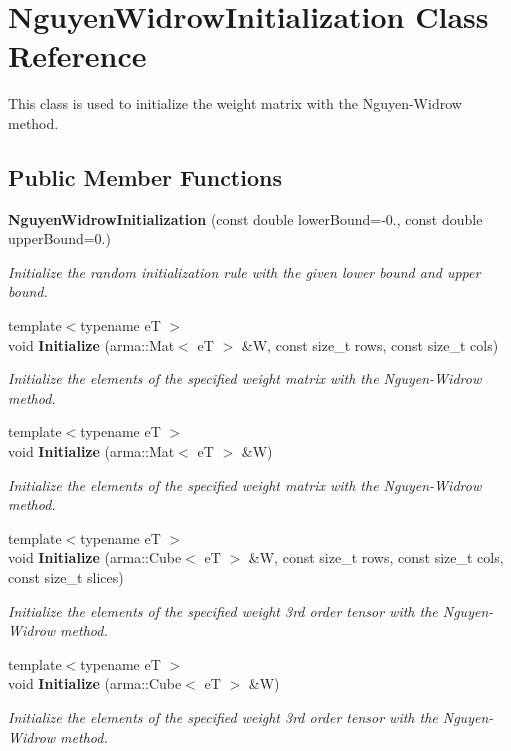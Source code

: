 \section{Nguyen\+Widrow\+Initialization Class Reference}
\label{classmlpack_1_1ann_1_1NguyenWidrowInitialization}


This class is used to initialize the weight matrix with the Nguyen-\/\+Widrow method.  


\subsection*{Public Member Functions}
\begin{DoxyCompactItemize}
\item 
\textbf{ Nguyen\+Widrow\+Initialization} (const double lower\+Bound=-\/0., const double upper\+Bound=0.)
\begin{DoxyCompactList}\small\item\em Initialize the random initialization rule with the given lower bound and upper bound. \end{DoxyCompactList}\item 
{\footnotesize template$<$typename eT $>$ }\\void \textbf{ Initialize} (arma\+::\+Mat$<$ eT $>$ \&W, const size\+\_\+t rows, const size\+\_\+t cols)
\begin{DoxyCompactList}\small\item\em Initialize the elements of the specified weight matrix with the Nguyen-\/\+Widrow method. \end{DoxyCompactList}\item 
{\footnotesize template$<$typename eT $>$ }\\void \textbf{ Initialize} (arma\+::\+Mat$<$ eT $>$ \&W)
\begin{DoxyCompactList}\small\item\em Initialize the elements of the specified weight matrix with the Nguyen-\/\+Widrow method. \end{DoxyCompactList}\item 
{\footnotesize template$<$typename eT $>$ }\\void \textbf{ Initialize} (arma\+::\+Cube$<$ eT $>$ \&W, const size\+\_\+t rows, const size\+\_\+t cols, const size\+\_\+t slices)
\begin{DoxyCompactList}\small\item\em Initialize the elements of the specified weight 3rd order tensor with the Nguyen-\/\+Widrow method. \end{DoxyCompactList}\item 
{\footnotesize template$<$typename eT $>$ }\\void \textbf{ Initialize} (arma\+::\+Cube$<$ eT $>$ \&W)
\begin{DoxyCompactList}\small\item\em Initialize the elements of the specified weight 3rd order tensor with the Nguyen-\/\+Widrow method. \end{DoxyCompactList}\end{DoxyCompactItemize}


